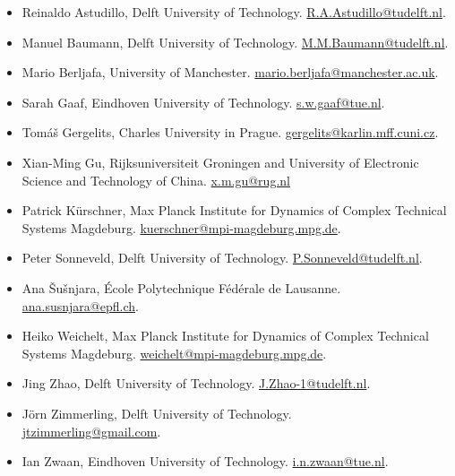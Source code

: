 \documentclass{article}
\begin{document}
\begin{itemize}

\item Reinaldo Astudillo, Delft University of Technology. \href{mailto:R.A.Astudillo@tudelft.nl}{R.A.Astudillo@tudelft.nl}.
\item Manuel Baumann, Delft University of Technology. \href{mailto:M.M.Baumann@tudelft.nl}{M.M.Baumann@tudelft.nl}.
\item Mario Berljafa, University of Manchester. \href{mailto:mario.berljafa@manchester.ac.uk}{mario.berljafa@manchester.ac.uk}.
\item Sarah Gaaf, Eindhoven University of Technology. \href{mailto:s.w.gaaf@tue.nl}{s.w.gaaf@tue.nl}.
\item Tom{\'a}{\v s} Gergelits, Charles University in Prague. \href{mailto:gergelits@karlin.mff.cuni.cz}{gergelits@karlin.mff.cuni.cz}.
\item Xian-Ming Gu, Rijksuniversiteit Groningen and University of
Electronic Science and Technology of China. \href{mailto:x.m.gu@rug.nl}{x.m.gu@rug.nl}
\item Patrick K\"{u}rschner, Max Planck Institute for Dynamics of Complex
Technical Systems Magdeburg. \href{mailto:kuerschner@mpi-magdeburg.mpg.de}{kuerschner@mpi-magdeburg.mpg.de}.
\item Peter Sonneveld, Delft University of Technology. \href{mailto:P.Sonneveld@tudelft.nl}{P.Sonneveld@tudelft.nl}.
\item Ana {\v S}u{\v s}njara, \'{E}cole Polytechnique F\'ed\'erale de Lausanne. \href{mailto:ana.susnjara@epfl.ch}{ana.susnjara@epfl.ch}.
\item Heiko Weichelt, Max Planck Institute for Dynamics of Complex
Technical Systems Magdeburg. \href{mailto:weichelt@mpi-magdeburg.mpg.de}{weichelt@mpi-magdeburg.mpg.de}.
\item Jing Zhao, Delft University of Technology. \href{mailto:J.Zhao-1@tudelft.nl}{J.Zhao-1@tudelft.nl}.
\item J\"orn Zimmerling, Delft University of Technology. \\ \href{mailto:jtzimmerling@gmail.com}{jtzimmerling@gmail.com}.
\item Ian Zwaan, Eindhoven University of Technology. \href{mailto:i.n.zwaan@tue.nl}{i.n.zwaan@tue.nl}.


\end{itemize}
\end{document}
